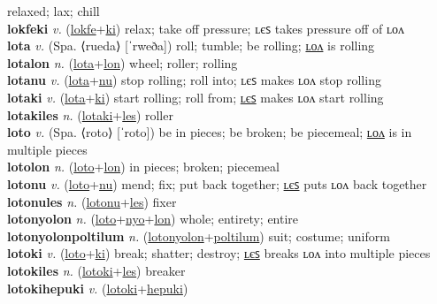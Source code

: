 relaxed; lax; chill \label{lokfelon} \\
\textbf{lokfeki} \textit{v.} (\hyperref[lokfe]{lokfe}+\hyperref[ki]{ki})
relax; take off pressure; ʟєꜱ takes pressure off of ʟᴏᴧ \label{lokfeki} \\
\textbf{lota} \textit{v.} (Spa. ⟨rueda⟩ [ˈrweða])
roll; tumble; be rolling; \hyperref[lotalon]{ʟᴏᴧ} is rolling \label{lota} \\
\textbf{lotalon} \textit{n.} (\hyperref[lota]{lota}+\hyperref[lon]{lon})
wheel; roller; rolling \label{lotalon} \\
\textbf{lotanu} \textit{v.} (\hyperref[lota]{lota}+\hyperref[nu]{nu})
stop rolling; roll into; ʟєꜱ makes ʟᴏᴧ stop rolling \label{lotanu} \\
\textbf{lotaki} \textit{v.} (\hyperref[lota]{lota}+\hyperref[ki]{ki})
start rolling; roll from; \hyperref[lotakiles]{ʟєꜱ} makes ʟᴏᴧ start rolling \label{lotaki} \\
\textbf{lotakiles} \textit{n.} (\hyperref[lotaki]{lotaki}+\hyperref[les]{les})
roller \label{lotakiles} \\
\textbf{loto} \textit{v.} (Spa. ⟨roto⟩ [ˈroto])
be in pieces; be broken; be piecemeal; \hyperref[lotolon]{ʟᴏᴧ} is in multiple pieces \label{loto} \\
\textbf{lotolon} \textit{n.} (\hyperref[loto]{loto}+\hyperref[lon]{lon})
in pieces; broken; piecemeal \label{lotolon} \\
\textbf{lotonu} \textit{v.} (\hyperref[loto]{loto}+\hyperref[nu]{nu})
mend; fix; put back together; \hyperref[lotonules]{ʟєꜱ} puts ʟᴏᴧ back together \label{lotonu} \\
\textbf{lotonules} \textit{n.} (\hyperref[lotonu]{lotonu}+\hyperref[les]{les})
fixer \label{lotonules} \\
\textbf{lotonyolon} \textit{n.} (\hyperref[loto]{loto}+\hyperref[nyo]{nyo}+\hyperref[lon]{lon})
whole; entirety; entire \label{lotonyolon} \\
\textbf{lotonyolonpoltilum} \textit{n.} (\hyperref[lotonyolon]{lotonyolon}+\hyperref[poltilum]{poltilum})
suit; costume; uniform \label{lotonyolonpoltilum} \\
\textbf{lotoki} \textit{v.} (\hyperref[loto]{loto}+\hyperref[ki]{ki})
break; shatter; destroy; \hyperref[lotokiles]{ʟєꜱ} breaks ʟᴏᴧ into multiple pieces \label{lotoki} \\
\textbf{lotokiles} \textit{n.} (\hyperref[lotoki]{lotoki}+\hyperref[les]{les})
breaker \label{lotokiles} \\
\textbf{lotokihepuki} \textit{v.} (\hyperref[lotoki]{lotoki}+\hyperref[hepuki]{hepuki})
